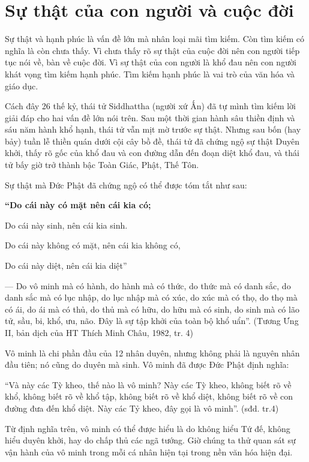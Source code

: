\chapter{Sự thật của con người và cuộc đời} %
\label{cha:su_that_cua_con_nguoi_va_cuoc_doi}

Sự thật và hạnh phúc là vấn đề lớn mà nhân loại mãi tìm kiếm. Còn tìm kiếm có nghĩa là còn chưa thấy. Vì chưa thấy rõ sự thật của cuộc đời nên con người tiếp tục nói về, bàn về cuộc đời. Vì sự thật của con người là khổ đau nên con người khát vọng tìm kiếm hạnh phúc. Tìm kiếm hạnh phúc là vai trò của văn hóa và giáo dục.

Cách đây 26 thế kỷ, thái tử Siddhattha (người xứ Ấn) đã tự mình tìm kiếm lời giải đáp cho hai vấn đề lớn nói trên. Sau một thời gian hành sâu thiền định và sáu năm hành khổ hạnh, thái tử vẫn mịt mờ trước sự thật. Nhưng sau bốn (hay bảy) tuần lễ thiền quán dưới cội cây bồ đề, thái tử đã chứng ngộ sự thật Duyên khởi, thấy rõ gốc của khổ đau và con đường dẫn đến đoạn diệt khổ đau, và thái tử bấy giờ trở thành bậc Toàn Giác, Phật, Thế Tôn.

Sự thật mà Đức Phật đã chứng ngộ có thể được tóm tắt như sau:


{\bf ``Do cái này có mặt nên cái kia có;

Do cái này sinh, nên cái kia sinh.

Do cái này không có mặt, nên cái kia không có,

Do cái này diệt, nên cái kia diệt''}

— Do vô minh mà có hành, do hành mà có thức, do thức mà có danh sắc, do danh sắc mà có lục nhập, do lục nhập mà có xúc, do xúc mà có thọ, do thọ mà có ái, do ái mà có thủ, do thủ mà có hữu, do hữu mà có sinh, do sinh mà có lão tử, sầu, bi, khổ, ưu, não. Đây là sự tập khởi của toàn bộ khổ uẩn''. (Tương Ưng II, bản dịch của HT Thích Minh Châu, 1982, tr. 4)

Vô minh là chi phần đầu của 12 nhân duyên, nhưng không phải là nguyên nhân đầu tiên; nó cũng do duyên mà sinh. Vô minh đã được Đức Phật định nghĩa:

``Và này các Tỳ kheo, thế nào là vô minh? Này các Tỳ kheo, không biết rõ về khổ, không biết rõ về khổ tập, không biết rõ về khổ diệt, không biết rõ về con đường đưa đến khổ diệt. Này các Tỷ kheo, đây gọi là vô minh''. (sđd. tr.4)

Từ định nghĩa trên, vô minh có thể được hiểu là do không hiểu Tứ đế, không hiểu duyên khởi, hay do chấp thủ các ngã tướng. Giờ chúng ta thử quan sát sự vận hành của vô minh trong mỗi cá nhân hiện tại trong nền văn hóa hiện đại.

